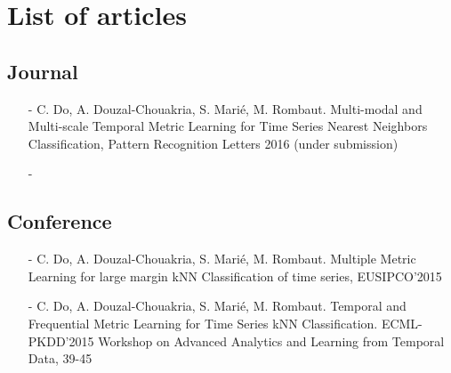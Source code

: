 \chapter*{List of articles}
\label{sec:article}

\section*{Journal}
\begin{itemize}
	\item[-] C. Do, A. Douzal-Chouakria, S. Marié, M. Rombaut. Multi-modal and Multi-scale Temporal Metric Learning for Time Series Nearest Neighbors Classification, Pattern Recognition Letters 2016 (under submission) 
	\item[-] 
\end{itemize}
	
\section*{Conference}
\begin{itemize}
	\item[-] C. Do, A. Douzal-Chouakria, S. Marié, M. Rombaut. Multiple Metric Learning for large margin kNN Classification of time series, EUSIPCO'2015 
	\item[-] C. Do, A. Douzal-Chouakria, S. Marié, M. Rombaut. Temporal and Frequential Metric Learning for Time Series kNN Classification. ECML-PKDD'2015 Workshop on Advanced Analytics and Learning from Temporal Data, 39-45
\end{itemize}

